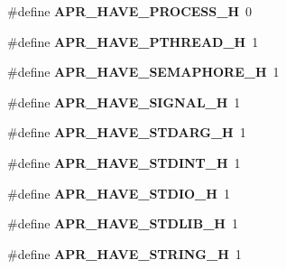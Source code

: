 \begin{DoxyCompactItemize}
\item 
\hypertarget{group__apr__platform_ga793aedef0bacf93838d7dc12304e4db1}{\#define {\bfseries A\-P\-R\-\_\-\-H\-A\-V\-E\-\_\-\-P\-R\-O\-C\-E\-S\-S\-\_\-\-H}~0}\label{group__apr__platform_ga793aedef0bacf93838d7dc12304e4db1}

\item 
\hypertarget{group__apr__platform_ga4275921ca7165eb1b2a3732a40f1b4ec}{\#define {\bfseries A\-P\-R\-\_\-\-H\-A\-V\-E\-\_\-\-P\-T\-H\-R\-E\-A\-D\-\_\-\-H}~1}\label{group__apr__platform_ga4275921ca7165eb1b2a3732a40f1b4ec}

\item 
\hypertarget{group__apr__platform_ga9080d52aaa134fdefc9a03275c7ac4a6}{\#define {\bfseries A\-P\-R\-\_\-\-H\-A\-V\-E\-\_\-\-S\-E\-M\-A\-P\-H\-O\-R\-E\-\_\-\-H}~1}\label{group__apr__platform_ga9080d52aaa134fdefc9a03275c7ac4a6}

\item 
\hypertarget{group__apr__platform_ga124a7e90c6c2c74fc54f995e025f694e}{\#define {\bfseries A\-P\-R\-\_\-\-H\-A\-V\-E\-\_\-\-S\-I\-G\-N\-A\-L\-\_\-\-H}~1}\label{group__apr__platform_ga124a7e90c6c2c74fc54f995e025f694e}

\item 
\hypertarget{group__apr__platform_gaece8f1d70792f3b735fd63cb2233b6a3}{\#define {\bfseries A\-P\-R\-\_\-\-H\-A\-V\-E\-\_\-\-S\-T\-D\-A\-R\-G\-\_\-\-H}~1}\label{group__apr__platform_gaece8f1d70792f3b735fd63cb2233b6a3}

\item 
\hypertarget{group__apr__platform_ga967df26603971704f396b0ec776ed86f}{\#define {\bfseries A\-P\-R\-\_\-\-H\-A\-V\-E\-\_\-\-S\-T\-D\-I\-N\-T\-\_\-\-H}~1}\label{group__apr__platform_ga967df26603971704f396b0ec776ed86f}

\item 
\hypertarget{group__apr__platform_ga3b5b55be7a0839f63e0ff1d60a3354ff}{\#define {\bfseries A\-P\-R\-\_\-\-H\-A\-V\-E\-\_\-\-S\-T\-D\-I\-O\-\_\-\-H}~1}\label{group__apr__platform_ga3b5b55be7a0839f63e0ff1d60a3354ff}

\item 
\hypertarget{group__apr__platform_ga1c8c763f1a54be0d960e0bfa838ee0fb}{\#define {\bfseries A\-P\-R\-\_\-\-H\-A\-V\-E\-\_\-\-S\-T\-D\-L\-I\-B\-\_\-\-H}~1}\label{group__apr__platform_ga1c8c763f1a54be0d960e0bfa838ee0fb}

\item 
\hypertarget{group__apr__platform_ga0bc16ef0942f44f579dc8027d50f780a}{\#define {\bfseries A\-P\-R\-\_\-\-H\-A\-V\-E\-\_\-\-S\-T\-R\-I\-N\-G\-\_\-\-H}~1}\label{group__apr__platform_ga0bc16ef0942f44f579dc8027d50f780a}


\end{DoxyCompactItemize}
